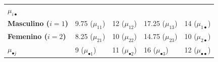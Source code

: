 \documentclass[]{book}
\theoremstyle{definition}
\theoremstyle{definition}
\theoremstyle{definition}
\theoremstyle{remark}
\begin{document}
\begin{longtable}[]{@{}lllll@{}}
\begin{minipage}[t]{0.20\columnwidth}
\textbf{\(\mu_{i\bullet}\)}\strut
\end{minipage}\tabularnewline
\begin{minipage}[t]{0.15\columnwidth}\raggedright
\textbf{Masculino (\(i = 1\))}\strut
\end{minipage} & \begin{minipage}[t]{0.17\columnwidth}\raggedright
9.75 (\(\mu_{11}\))\strut
\end{minipage} & \begin{minipage}[t]{0.17\columnwidth}\raggedright
12 (\(\mu_{12}\))\strut
\end{minipage} & \begin{minipage}[t]{0.16\columnwidth}\raggedright
17.25 (\(\mu_{13}\))\strut
\end{minipage} & \begin{minipage}[t]{0.20\columnwidth}\raggedright
14 (\(\mu_{1 \bullet}\))\strut
\end{minipage}\tabularnewline
\begin{minipage}[t]{0.15\columnwidth}\raggedright
\textbf{Femenino (\(i = 2\))}\strut
\end{minipage} & \begin{minipage}[t]{0.17\columnwidth}\raggedright
8.25 (\(\mu_{21}\))\strut
\end{minipage} & \begin{minipage}[t]{0.17\columnwidth}\raggedright
10 (\(\mu_{22}\))\strut
\end{minipage} & \begin{minipage}[t]{0.16\columnwidth}\raggedright
14.75 (\(\mu_{23}\))\strut
\end{minipage} & \begin{minipage}[t]{0.20\columnwidth}\raggedright
10 (\(\mu_{2 \bullet}\))\strut
\end{minipage}\tabularnewline
\begin{minipage}[t]{0.15\columnwidth}\raggedright
\textbf{\(\mu_{\bullet j}\)}\strut
\end{minipage} & \begin{minipage}[t]{0.17\columnwidth}\raggedright
9 (\(\mu_{\bullet 1}\))\strut
\end{minipage} & \begin{minipage}[t]{0.17\columnwidth}\raggedright
11 (\(\mu_{\bullet 2}\))\strut
\end{minipage} & \begin{minipage}[t]{0.16\columnwidth}\raggedright
16 (\(\mu_{\bullet 3}\))\strut
\end{minipage} & \begin{minipage}[t]{0.20\columnwidth}\raggedright
12 (\(\mu_{\bullet \bullet}\))\strut
\end{minipage}\tabularnewline
\bottomrule
\end{longtable}
\end{document}
